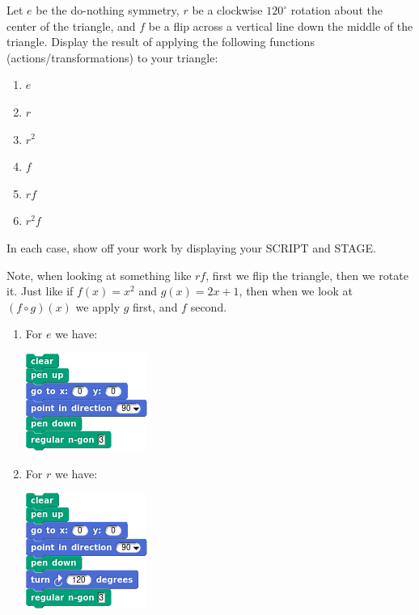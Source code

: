 \documentclass[noauthor,nooutcomes,12pt,hints]{ximera}
\begin{document}
\begin{question}
  Let $e$ be the do-nothing symmetry, $r$ be a clockwise $120^\circ$
  rotation about the center of the triangle, and $f$ be a flip across
  a vertical line down the middle of the triangle. Display the result
  of applying the following functions (actions/transformations) to
  your triangle:
  \begin{enumerate}
  \item $e$
  \item $r$
  \item $r^2$
  \item $f$
  \item $rf$
  \item $r^2 f$
  \end{enumerate}
  In each case, show off your work by displaying your SCRIPT and
  STAGE.
  \begin{hint}
    Note, when looking at something like $rf$, first we flip the
    triangle, then we rotate it. Just like if $f(x) = x^2$ and $g(x) =
    2x+1$, then when we look at $(f\circ g)(x)$ we apply $g$ first,
    and $f$ second.
  \end{hint}
  \begin{freeResponse}
    \begin{enumerate}
    \item For $e$ we have:
      \begin{center}
        \includegraphics[width=.3\textwidth]{eTriSCRIPT.png}   \qquad {}
      \end{center}
    \item For $r$ we have:
      \begin{center}
        \includegraphics[width=.3\textwidth]{rTriSCRIPT.png}   \qquad {}

\end{center}
\end{enumerate}
\end{freeResponse}
\end{question}
\end{document}
